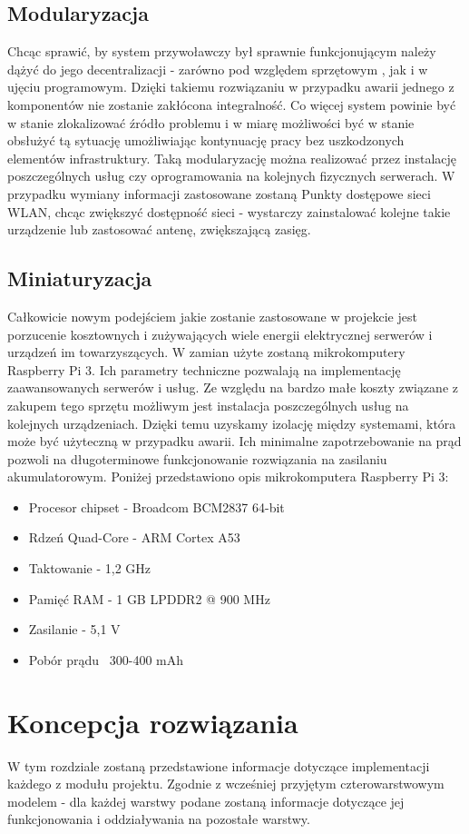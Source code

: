 \documentclass[12pt]{article} %
\begin{document}
\subsection{Modularyzacja} %
Chcąc sprawić, by system przywoławczy był sprawnie funkcjonującym należy dążyć do jego decentralizacji - zarówno pod względem sprzętowym , jak i w ujęciu programowym. Dzięki takiemu rozwiązaniu w przypadku awarii jednego z komponentów nie zostanie zakłócona integralność. Co więcej system powinie być w stanie zlokalizować źródło problemu i w miarę możliwości być w stanie obsłużyć tą sytuację umożliwiając kontynuację pracy bez uszkodzonych elementów infrastruktury.
Taką modularyzację można realizować przez instalację poszczególnych usług czy oprogramowania na kolejnych fizycznych serwerach. W przypadku wymiany informacji zastosowane zostaną Punkty dostępowe sieci WLAN, chcąc zwiększyć dostępność sieci - wystarczy zainstalować kolejne takie urządzenie lub zastosować antenę, zwiększającą zasięg. 
\subsection{Miniaturyzacja} %
Całkowicie nowym podejściem jakie zostanie zastosowane w projekcie jest porzucenie kosztownych i zużywających wiele energii elektrycznej serwerów i urządzeń im towarzyszących. W zamian użyte zostaną mikrokomputery Raspberry Pi 3. Ich parametry techniczne pozwalają na implementację zaawansowanych serwerów i usług. Ze względu na bardzo małe koszty związane z zakupem tego sprzętu możliwym jest instalacja poszczególnych usług na kolejnych urządzeniach. Dzięki temu uzyskamy izolację między systemami, która może być użyteczną w przypadku awarii. Ich minimalne zapotrzebowanie na prąd pozwoli na długoterminowe funkcjonowanie rozwiązania na zasilaniu akumulatorowym. Poniżej przedstawiono opis mikrokomputera Raspberry Pi 3:
\begin{itemize}
\item Procesor chipset - Broadcom BCM2837 64-bit
\item Rdzeń	Quad-Core - ARM Cortex A53
\item Taktowanie - 1,2 GHz
\item Pamięć RAM - 1 GB LPDDR2 @ 900 MHz
\item Zasilanie	- 5,1 V 
\item Pobór prądu ~300-400 mAh
\end{itemize}

\section{Koncepcja rozwiązania}
W tym rozdziale zostaną przedstawione informacje dotyczące implementacji każdego z modułu projektu. Zgodnie z wcześniej przyjętym czterowarstwowym modelem - dla każdej warstwy podane zostaną informacje dotyczące jej funkcjonowania i oddziaływania na pozostałe warstwy.
\end{document}
